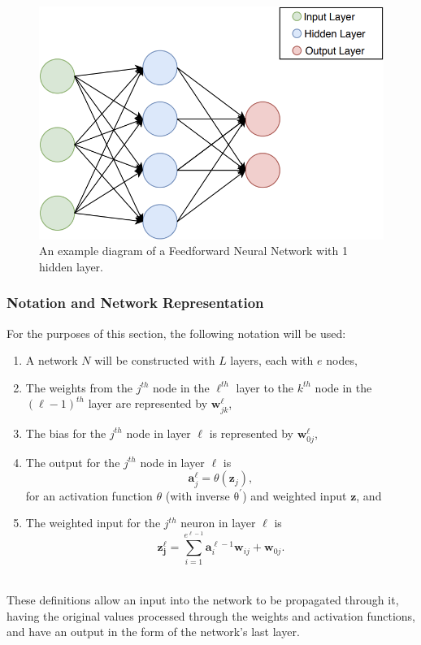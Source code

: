 \documentclass[a4paper,11pt,oneside]{article}
\theoremstyle{plain}
\theoremstyle{definition}
\begin{document}
	\begin{figure}[H]
		\centering 
		\includegraphics[scale=0.5]{images/implementation/neural_network_diagram.png}
		\caption[Feedforward Neural Network Diagram]{An example diagram of a Feedforward Neural Network with 1 hidden layer.}
		\label{figure-neural_network_diagram}
	\end{figure}		
	
	\subsubsection{Notation and Network Representation}\label{imp_ffn_functions}
	
	For the purposes of this section, the following notation will be used:
	
	\begin{enumerate}
		\item A network $N$ will be constructed with $L$ layers, each with $e$ nodes,
		\item The weights from the $j^{th}$ node in the $\ell^{th}$ layer to the $k^{th}$ node in the $(\ell-1)^{th}$ layer are represented by $\mathbf{w}^\ell_{jk}$,
		\item The bias for the $j^{th}$ node in layer $\ell$ is represented by $\mathbf{w}^\ell_{0j}$,
		\item The output for the $j^{th}$ node in layer $\ell$ is 
		\begin{equation}\label{eq_activation_output}
		\mathbf{a}^\ell_j = \theta(\mathbf{z}_j) ,
		\end{equation} 
		for an activation function $\theta$ (with inverse $\mathrm{\theta^{\prime}}$) and weighted input $\mathbf{z}$, and
		\item The weighted input for the $j^{th}$ neuron in layer $\ell$ is 
		\begin{equation}\label{eq_weighted_input}
		\mathbf{z^\ell_j}=\sum_{i=1}^{e^{\ell-1}}{\mathbf{a}^{\ell-1}_i\mathbf{w}_{ij}} + \mathbf{w}_{0j} .
		\end{equation}
	\end{enumerate}
	~\\
	These definitions allow an input into the network to be propagated through it, having the original values processed through the weights and activation functions, and have an output in the form of the network's last layer.
	
\end{document}
